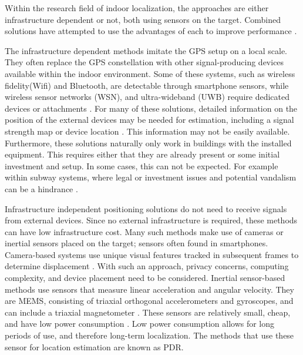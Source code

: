 Within the research field of indoor localization, the approaches are either infrastructure dependent or not, both using sensors on the target. Combined solutions have attempted to use the advantages of each to improve performance \cite{Gu2019, Correa2017}.\par

The infrastructure dependent methods imitate the GPS setup on a local scale. They often replace the GPS constellation with other signal-producing devices available within the indoor environment. Some of these systems, such as wireless fidelity(Wifi) and Bluetooth, are detectable through smartphone sensors, while wireless sensor networks (WSN), and ultra-wideband (UWB) require dedicated devices or attachments \cite{Wu2019,Jackermeier2018,Davidson2017}. For many of these solutions, detailed information on the position of the external devices may be needed for estimation, including a signal strength map or device location \cite{Jackermeier2018}. This information may not be easily available. Furthermore, these solutions naturally only work in buildings with the installed equipment. This requires either that they are already present or some initial investment and setup. In some cases, this can not be expected. For example within subway systems, where legal or investment issues and potential vandalism can be a hindrance \cite{Torok2014}. \par
%

Infrastructure independent positioning solutions do not need to receive signals from external devices. Since no external infrastructure is required, these methods can have low infrastructure cost. Many such methods make use of cameras or inertial sensors placed on the target; sensors often found in smartphones. Camera-based systems use unique visual features tracked in subsequent frames to determine displacement \cite{Gu2019}. With such an approach, privacy concerns, computing complexity, and device placement need to be considered. Inertial sensor-based methods use sensors that measure linear acceleration and angular velocity. They are \ac{MEMS},  consisting of triaxial orthogonal accelerometers and gyroscopes, and can include a triaxial magnetometer \cite{Yang2014}. These sensors are relatively small, cheap, and have low power consumption \cite{Olsson2016}. Low power consumption allows for long periods of use, and therefore long-term localization. The methods that use these sensor for location estimation are known as \ac{PDR}. \par

